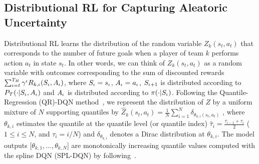 \documentclass{article}
\newcommand{\horizon}{T_{H}}
\newcommand{\state}{s}
\newcommand{\action}{a}
\newcommand{\transition}{t}
\newcommand{\reward}{r}
\newcommand{\agentIndex}{k}
\newcommand{\quantielIndex}{i}
\begin{document}
\subsection{Distributional RL for Capturing Aleatoric Uncertainty}\label{subsec:aleatoric-uncertainty}
Distributional RL learns the distribution of the random variable $Z_{\agentIndex}(\state_{t},\action_{t})$ that 
corresponds to the number of future goals when a player of team $k$ performs action $\action_{t}$ in state $\state_{t}$.  In other words, we can think of $Z_{\agentIndex}(\state_{t},\action_{t})$ as a random variable with outcomes corresponding to the sum of discounted rewards $\sum_{\iota=t}^{\horizon}\gamma^{\iota}\MakeUppercase{R}_{\agentIndex,\iota}(\MakeUppercase{\state}_\iota,\MakeUppercase{\action}_\iota)$, where $\MakeUppercase{\state}_\iota=\state_{\iota}$, $\MakeUppercase{\action}_\iota=\action_{\iota}$,
$\MakeUppercase{\state}_{\iota+1}$ is distributed according to $P_{\mathcal{\MakeUppercase{\transition}}}(\cdot|\MakeUppercase{\state}_\iota,\MakeUppercase{\action}_\iota)$ and $\MakeUppercase{\action}_\iota$ is distributed according to $\pi(\cdot|\MakeUppercase{\state}_\iota)$. 
Following the Quantile-Regression (QR)-DQN method~\cite{bellemare2017distributional}, we represent the distribution of $Z$ by a uniform mixture of $N$ supporting quantiles by
$
\hat{Z}_{\agentIndex}(\state_{t},\action_{t}) = \frac{1}{N}\sum_{\quantielIndex=1}^N \delta_{\theta_{\agentIndex,\quantielIndex}(\state_{t},\action_{t})}
$
, where $\theta_{\agentIndex,\quantielIndex}$ estimates the quantile at the quantile level (or quantile index) $\hat{\tau}_i=\frac{\tau_{\quantielIndex-1}+\tau_\quantielIndex}{2}$ ($1\leq \quantielIndex\leq N$, and $\tau_\quantielIndex=\quantielIndex/N$) and  $\delta_{\theta_{\agentIndex,i}}$ denotes a Dirac distribution at $\theta_{\agentIndex,\quantielIndex}$. The model outputs [$\theta_{\agentIndex,1},\dots,\theta_{\agentIndex,N}$] are monotonically increasing quantile values computed with the spline DQN (SPL-DQN) by following~\cite{luo2022distributional}.
\end{document}
